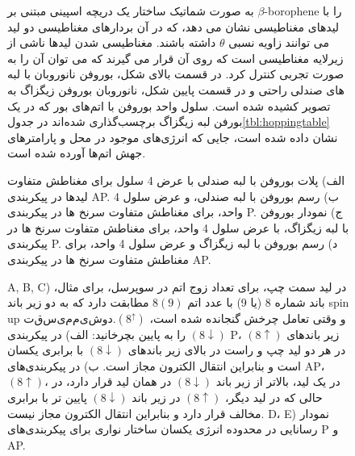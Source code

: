 \begin{figure}
\caption{به صورت شماتیک ساختار یک دریچه اسپینی مبتنی بر $\beta$-borophene را با لیدهای مغناطیسی نشان می دهد، که در آن بردارهای مغناطیسی دو لید می توانند زاویه نسبی $\theta$ داشته باشند. مغناطیسی شدن لیدها ناشی از زیرلایه مغناطیسی است که روی آن قرار می گیرند که می توان آن را به صورت تجربی کنترل کرد. در قسمت بالای شکل، بوروفن نانوروبان با لبه های صندلی راحتی و در قسمت پایین شکل، نانوروبان بوروفن زیگزاگ به تصویر کشیده شده است. سلول واحد بوروفن با اتم‌های بور که در یک بورفن لبه زیگزاگ برچسب‌گذاری شده‌اند در جدول\ref{tbl:hoppingtable} نشان داده شده است، جایی که انرژی‌های موجود در محل و پارامترهای جهش اتم‌ها آورده شده است.}
  \label{fig:model}
\end{figure}
    
\begin{figure}[!ht]
  \begin{latin}
  \centering
  \resizebox{0.45\textwidth}{!}{}
  \resizebox{0.45\textwidth}{!}{}
  \resizebox{0.45\textwidth}{!}{}
  \resizebox{0.45\textwidth}{!}{}  
  \end{latin}
\caption{الف) پلات بوروفن با لبه صندلی با عرض 4 سلول برای مغناطش متفاوت لیدها در پیکربندی AP. ب) رسم بوروفن با لبه صندلی، و عرض سلول 4 واحد، برای مغناطش متفاوت سرنخ ها در پیکربندی P. ج) نمودار بوروفن با لبه زیگزاگ، با عرض سلول 4 واحد، برای مغناطش متفاوت سرنخ ها در پیکربندی P. د) رسم بوروفن با لبه زیگزاگ و عرض سلول 4 واحد، برای مغناطش متفاوت سرنخ ها در پیکربندی AP.}
\label{fig:conductance}
\end{figure}
\begin{figure}[!ht]
  \begin{latin}
    \centering
    \resizebox{0.32\textwidth}{!}{}
    \resizebox{0.32\textwidth}{!}{}
    \resizebox{0.32\textwidth}{!}{}
    \resizebox{0.45\textwidth}{!}{}
    \resizebox{0.45\textwidth}{!}{}
  \end{latin}
\caption{A, B, C) در لید سمت چپ، برای تعداد زوج اتم در سوپرسل، برای مثال، باند شماره 8 (یا 9) با عدد اتم $8(9)$ مطابقت دارد که به دو زیر باند spin up $ تقسیم می شود. (8^\uparrow)$ و وقتی تعامل چرخش گنجانده شده است، $(8\downarrow)$ را به پایین بچرخانید: الف) در پیکربندی P، زیر باندهای $(8\uparrow)$ در هر دو لید چپ و راست در بالای زیر باندهای $(8\downarrow)$ با برابری یکسان است و بنابراین انتقال الکترون مجاز است. ب) در پیکربندی‌های AP، $(8\uparrow)$، در یک لید، بالاتر از زیر باند $(8\downarrow)$ در همان لید قرار دارد، در حالی که در لید دیگر، $(8\uparrow) $ در زیر باند $(8\downarrow)$ پایین تر با برابری مخالف قرار دارد و بنابراین انتقال الکترون مجاز نیست. D، E) نمودار رسانایی در محدوده انرژی یکسان ساختار نواری برای پیکربندی‌های P و AP.}
\label{fig:bandconductance}
\end{figure}


